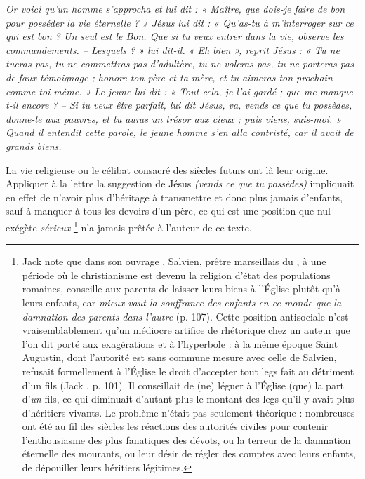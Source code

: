 \begin{displayquote}[Mt~19,~16-22]
\emph{Or voici qu'un homme s'approcha et lui dit : « Maître, que dois-je faire de bon pour posséder la vie éternelle ? » Jésus lui dit : « Qu'as-tu à m'interroger sur ce qui est bon ? Un seul est le Bon. Que si tu veux entrer dans la vie, observe les commandements. -- Lesquels ? » lui dit-il. « Eh bien », reprit Jésus : « Tu ne tueras pas, tu ne commettras pas d'adultère, tu ne voleras pas, tu ne porteras pas de faux témoignage ; honore ton père et ta mère, et tu aimeras ton prochain comme toi-même. » Le jeune lui dit : « Tout cela, je l'ai gardé ; que me manque-t-il encore ? -- Si tu veux être parfait, lui dit Jésus, va, vends ce que tu possèdes, donne-le aux pauvres, et tu auras un trésor aux cieux ; puis viens, suis-moi. » Quand il entendit cette parole, le jeune homme s'en alla contristé, car il avait de grands biens.}
\end{displayquote}

 La vie religieuse ou le célibat consacré des siècles futurs ont là leur origine. Appliquer à la lettre la suggestion de Jésus \emph{(vends ce que tu possèdes)} impliquait en effet de n'avoir plus d'héritage à transmettre et donc plus jamais d'enfants, sauf à manquer à tous les devoirs d'un père, ce qui est une position que nul exégète \emph{sérieux}%
\footnote{Jack  note que dans son ouvrage , Salvien, prêtre marseillais du , à une période où le christianisme est devenu la religion d'état des populations romaines, conseille aux parents de laisser leurs biens à l'Église plutôt qu'à leurs enfants, car \emph{mieux vaut la souffrance des enfants en ce monde que la damnation des parents dans l'autre} (p. 107). Cette position antisociale n'est vraisemblablement qu'un médiocre artifice de rhétorique chez un auteur que l'on dit porté aux exagérations et à l'hyperbole : à la même époque Saint Augustin, dont l'autorité est sans commune mesure avec celle de Salvien, refusait formellement à l'Église le droit d'accepter tout legs fait au détriment d'un fils (Jack , p. 101). Il conseillait de (ne) léguer à l'Église (que) la part d'\emph{un} fils, ce qui diminuait d'autant plus le montant des legs qu'il y avait plus d'héritiers vivants. Le problème n'était pas seulement théorique : nombreuses ont été au fil des siècles les réactions des autorités civiles pour contenir l'enthousiasme des plus fanatiques des dévots, ou la terreur de la damnation éternelle des mourants, ou leur désir de régler des comptes avec leurs enfants, de dépouiller leurs héritiers légitimes.}
n'a jamais prêtée à l'auteur de ce texte. 

